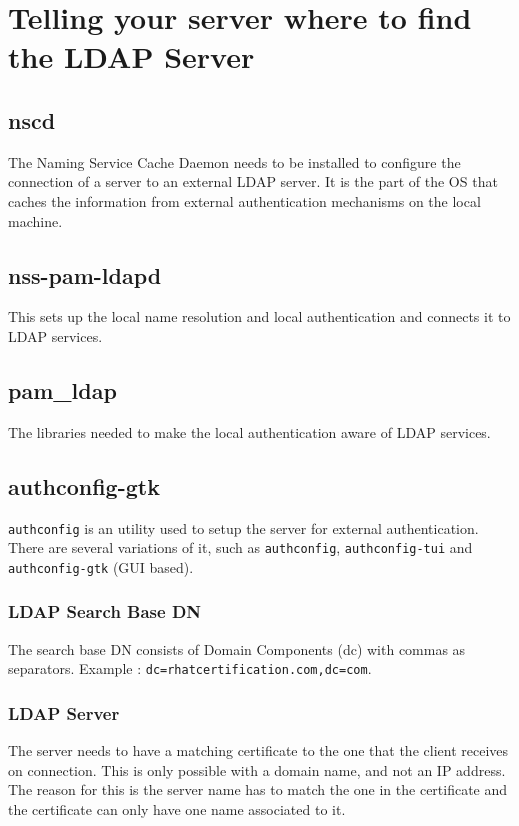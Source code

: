 \documentclass{report}
\begin{document}
	\section{Telling your server where to find the LDAP Server}
	
	\subsection{nscd}
	The Naming Service Cache Daemon needs to be installed to configure the connection of a server to an external LDAP server. It is the part of the OS that caches the information from external authentication mechanisms on the local machine.
	
	\subsection{nss-pam-ldapd}
	This sets up the local name resolution and local authentication and connects it to LDAP services. 
	
	\subsection{pam\_ldap}
	The libraries needed to make the local authentication aware of LDAP services. 
	
	\subsection{authconfig-gtk}
	\verb|authconfig| is an utility used to setup the server for external authentication. There are several variations of it, such as \verb|authconfig|, \verb|authconfig-tui| and \verb|authconfig-gtk| (GUI based).
	
	\subsubsection{LDAP Search Base DN}
	The search base DN consists of Domain Components (dc) with commas as separators. Example : \verb|dc=rhatcertification.com,dc=com|. 
	
	\subsubsection{LDAP Server}
	The server needs to have a matching certificate to the one that the client receives on connection. This is only possible with a domain name, and not an IP address. The reason for this is the server name has to match the one in the certificate and the certificate can only have one name associated to it. 
	
\end{document}
